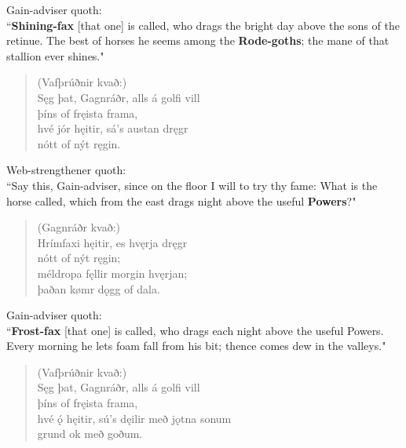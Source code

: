 \bvb Gain-adviser quoth: \\ “\textbf{Shining-fax} [that one] is called, who drags the bright day above the sons of the retinue. The best of horses he seems among the \textbf{Rode-goths}; the mane of that stallion ever shines." \\

\begin{verse}
(Vafþrúðnir kvað:) \\%
\bva Sęg þat, Gagnráðr, \hld alls á golfi vill \\%
\ind þíns of fręista frama, \\%
hvé jór hęitir, \hld sá's austan dręgr \\%
\ind nótt of nýt ręgin.\\%
\end{verse}

\bvb Web-strengthener quoth: \\ “Say this, Gain-adviser, since on the floor I will to try thy fame: What is the horse called, which from the east drags night above the useful \textbf{Powers}?" \\

\begin{verse}
(Gagnráðr kvað:) \\%
\bva Hrímfaxi hęitir, \hld es hvęrja dręgr \\%
\ind nótt of nýt ręgin; \\%
méldropa fęllir \hld morgin hvęrjan; \\%
\ind þaðan kømr dǫgg of dala.\\%
\end{verse}

\bvb Gain-adviser quoth: \\ “\textbf{Frost-fax} [that one] is called, who drags each night above the useful Powers. Every morning he lets foam fall from his bit\footnotemark[26]; thence comes dew in the valleys." \\

\begin{verse}
(Vafþrúðnir kvað:) \\%
\bva Sęg þat, Gagnráðr, \hld alls á golfi vill \\%
\ind þíns of fręista frama, \\%
hvé ǫ́ hęitir, \hld sú's dęilir með jǫtna sonum \\%
\ind grund ok með goðum.\\%
\end{verse}

